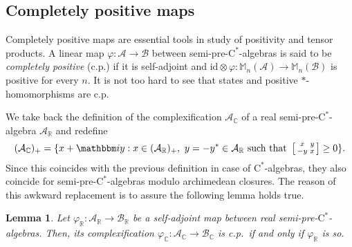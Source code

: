\documentclass[12pt]{amsart}
\newtheorem{lem}[thm]{Lemma}
\theoremstyle{definition}
\begin{document}
\subsection{Completely positive maps}
Completely positive maps are essential tools in study of positivity and tensor products.
A linear map ${\varphi}\colon{{\mathcal A}}\to{{\mathcal B}}$ between
{semi-pre-$\mathrm{C}^*$-alge\-bra\xspace}{}s is said to be \emph{completely positive}
(c.p.) if it is self-adjoint and
${\mathrm{id}}\otimes{\varphi}\colon {{\mathbb M}}_n({{\mathcal A}})\to{{\mathbb M}}_n({{\mathcal B}})$ is positive for every $n$.
It is not too hard to see that states and positive {$*$-homo\-mor\-phism\xspace}{}s are c.p.

We take back the definition of the complexification ${{\mathcal A}}_{{\mathbb C}}$
of a real {semi-pre-$\mathrm{C}^*$-alge\-bra\xspace} ${{\mathcal A}}_{{\mathbb R}}$ and redefine
\[
({{\mathcal A}}_{{\mathbb C}})_+=\{ x + {{\mathbbm i}} y :
x\in({{\mathcal A}}_{{\mathbb R}})_+,\ y=-y^*\in{{\mathcal A}}_{{\mathbb R}}\mbox{ such that }
\left[\begin{smallmatrix} x & y \\ -y & x\end{smallmatrix}\right]\geq0\}.
\]
Since this coincides with the previous definition in case of {$\mathrm{C}^*$-alge\-bra\xspace}{}s, they also coincide
for {semi-pre-$\mathrm{C}^*$-alge\-bra\xspace}{}s modulo archimedean closures. The reason of this awkward
replacement is to assure the following lemma holds true.

\begin{lem}\label{lem:cprc}
Let ${\varphi}_{{\mathbb R}}\colon {{\mathcal A}}_{{\mathbb R}}\to{{\mathcal B}}_{{\mathbb R}}$ be a self-adjoint map between
real {semi-pre-$\mathrm{C}^*$-alge\-bra\xspace}{}s. Then, its complexification ${\varphi}_{{\mathbb C}}\colon {{\mathcal A}}_{{\mathbb C}}\to{{\mathcal B}}_{{\mathbb C}}$
is c.p.\ if and only if ${\varphi}_{{\mathbb R}}$ is so.
\end{lem}
\end{document}
